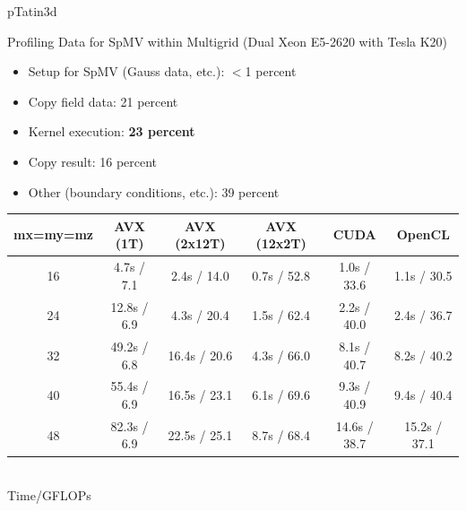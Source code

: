 

\begin{frame}{pTatin3d}

  \begin{block}{Profiling Data for SpMV within Multigrid (Dual Xeon E5-2620 with Tesla K20)}
  \begin{itemize}
   \item Setup for SpMV (Gauss data, etc.): $<$1 percent
   \item Copy field data: 21 percent
   \item Kernel execution: \textbf{23 percent}
   \item Copy result: 16 percent
   \item Other (boundary conditions, etc.): 39 percent
  \end{itemize}
  \end{block}

  
\begin{center} \footnotesize
\renewcommand{\arraystretch}{1.4}
\begin{tabular}{|c||c|c|c||c|c|}
 \hline
 mx=my=mz        & AVX (1T)      & AVX (2x12T)  & AVX (12x2T) & CUDA          & OpenCL \\
 \hline
 \hline
 16              &  4.7s / 7.1 &   2.4s / 14.0  & 0.7s / 52.8  &  1.0s / 33.6  & 1.1s / 30.5 \\
 24              & 12.8s / 6.9 &   4.3s / 20.4  & 1.5s / 62.4  &  2.2s / 40.0  & 2.4s / 36.7 \\
 32              & 49.2s / 6.8 &  16.4s / 20.6  & 4.3s / 66.0  &  8.1s / 40.7  & 8.2s / 40.2 \\
 40              & 55.4s / 6.9 &  16.5s / 23.1  & 6.1s / 69.6  &  9.3s / 40.9  & 9.4s / 40.4 \\ 
 48              & 82.3s / 6.9 &  22.5s / 25.1  & 8.7s / 68.4  & 14.6s / 38.7  & 15.2s / 37.1 \\
 \hline
\end{tabular} \\
 Time/GFLOPs
\end{center}

\end{frame}

